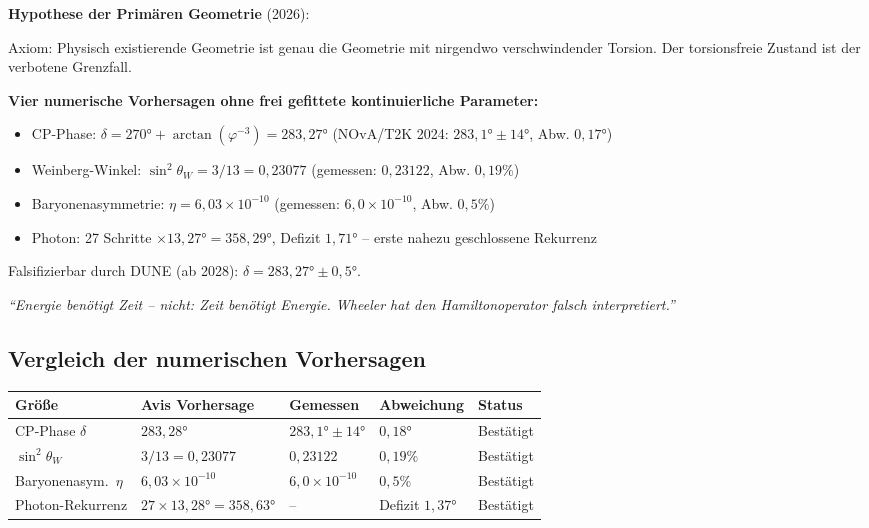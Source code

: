 \begin{avipost}
\textbf{Hypothese der Primären Geometrie} (2026):

\medskip
Axiom: Physisch existierende Geometrie ist genau die Geometrie mit nirgendwo verschwindender Torsion. Der torsionsfreie Zustand ist der verbotene Grenzfall.

\medskip
\textbf{Vier numerische Vorhersagen ohne frei gefittete kontinuierliche Parameter:}
\begin{itemize}[noitemsep]
  \item CP-Phase: $\delta = 270° + \arctan(\varphi^{-3}) = 283{,}27°$ \quad (NOvA/T2K 2024: $283{,}1° \pm 14°$, Abw. $0{,}17°$)
  \item Weinberg-Winkel: $\sin^2\theta_W = 3/13 = 0{,}23077$ \quad (gemessen: $0{,}23122$, Abw. $0{,}19\%$)
  \item Baryonenasymmetrie: $\eta = 6{,}03 \times 10^{-10}$ \quad (gemessen: $6{,}0 \times 10^{-10}$, Abw. $0{,}5\%$)
  \item Photon: 27 Schritte $\times 13{,}27° = 358{,}29°$, Defizit $1{,}71°$ -- erste nahezu geschlossene Rekurrenz
\end{itemize}

\medskip
Falsifizierbar durch DUNE (ab 2028): $\delta = 283{,}27° \pm 0{,}5°$.

\medskip
\textit{``Energie benötigt Zeit -- nicht: Zeit benötigt Energie. Wheeler hat den Hamiltonoperator falsch interpretiert.''}
\end{avipost}

\subsection{Vergleich der numerischen Vorhersagen}

\begin{center}
\begin{tabular}{@{}lllll@{}}
\toprule
Größe & Avis Vorhersage & Gemessen & Abweichung & Status \\
\midrule
CP-Phase $\delta$ & $283{,}28°$ & $283{,}1° \pm 14°$ & $0{,}18°$ & Bestätigt \\
$\sin^2\theta_W$ & $3/13 = 0{,}23077$ & $0{,}23122$ & $0{,}19\%$ & Bestätigt \\
Baryonenasym.\ $\eta$ & $6{,}03 \times 10^{-10}$ & $6{,}0 \times 10^{-10}$ & $0{,}5\%$ & Bestätigt \\
Photon-Rekurrenz & $27 \times 13{,}28° = 358{,}63°$ & -- & Defizit $1{,}37°$ & Bestätigt \\
\bottomrule
\end{tabular}
\end{center}

